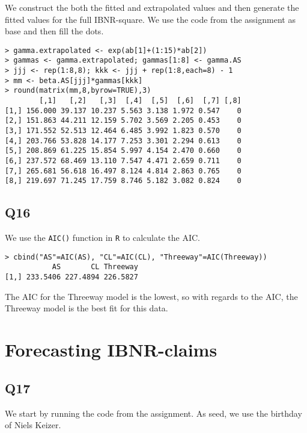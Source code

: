 \documentclass[11pt]{article}
\begin{document}
We construct the both the fitted and extrapolated values and then generate the fitted values for the full IBNR-square. We use the code from the assignment as base and then fill the dots.
\begin{verbatim}
> gamma.extrapolated <- exp(ab[1]+(1:15)*ab[2])
> gammas <- gamma.extrapolated; gammas[1:8] <- gamma.AS
> jjj <- rep(1:8,8); kkk <- jjj + rep(1:8,each=8) - 1
> mm <- beta.AS[jjj]*gammas[kkk]
> round(matrix(mm,8,byrow=TRUE),3)
        [,1]   [,2]   [,3]  [,4]  [,5]  [,6]  [,7] [,8]
[1,] 156.000 39.137 10.237 5.563 3.138 1.972 0.547    0
[2,] 151.863 44.211 12.159 5.702 3.569 2.205 0.453    0
[3,] 171.552 52.513 12.464 6.485 3.992 1.823 0.570    0
[4,] 203.766 53.828 14.177 7.253 3.301 2.294 0.613    0
[5,] 208.869 61.225 15.854 5.997 4.154 2.470 0.660    0
[6,] 237.572 68.469 13.110 7.547 4.471 2.659 0.711    0
[7,] 265.681 56.618 16.497 8.124 4.814 2.863 0.765    0
[8,] 219.697 71.245 17.759 8.746 5.182 3.082 0.824    0
\end{verbatim}

\subsection*{Q16}

We use the \verb|AIC()| function in \verb|R| to calculate the AIC.

\begin{verbatim}
> cbind("AS"=AIC(AS), "CL"=AIC(CL), "Threeway"=AIC(Threeway))
           AS       CL Threeway
[1,] 233.5406 227.4894 226.5827
\end{verbatim}

The AIC for the Threeway model is the lowest, so with regards to the AIC, the Threeway model is the best fit for this data.

\section{Forecasting IBNR-claims}

\subsection*{Q17}

We start by running the code from the assignment. As seed, we use the birthday of Niels Keizer.
\end{document}
